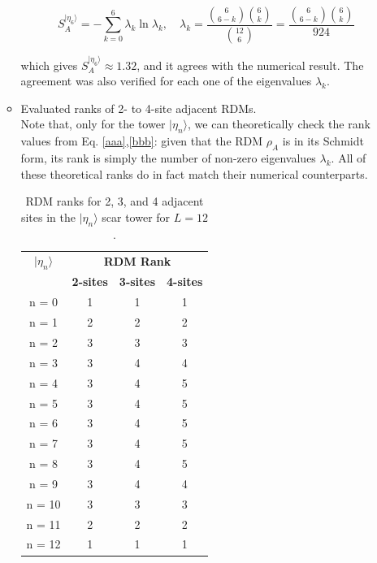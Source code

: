 \documentclass[11pt]{article}
\begin{document}
\begin{itemize}
\begin{itemize}
        \begin{equation}
        S^{|\eta_6\rangle }_A = - \sum_{k=0}^{6} \lambda_k \ln \lambda_k, \quad \lambda_k = \frac{\binom{6}{6-k}\binom{6}{k}}{\binom{12}{6}} =  \frac{\binom{6}{6-k}\binom{6}{k}}{924}
        \end{equation}
        
        which gives $S^{|\eta_6\rangle }_A \approx 1.32$, and it agrees with the numerical result. The agreement was also verified for each one of the eigenvalues $\lambda_k$.
         
        \item Evaluated ranks of 2- to 4-site adjacent RDMs.\\
        Note that, only for the tower $|\eta_n\rangle$, we can theoretically check the rank values from Eq. \eqref{aaa},\eqref{bbb}: given that the RDM $\rho_A$ is in its Schmidt form, its rank is simply the number of non-zero eigenvalues $\lambda_k$. All of these theoretical ranks do in fact match their numerical counterparts.\\
        
         \begin{table}[H]
	\centering
	\begin{tabular}{|c|ccc|}
	\hline
	\textbf{$|\eta_n\rangle$} & \multicolumn{3}{c|}{\textbf{RDM Rank}} \\
	\cline{2-4}
	& \textbf{2-sites} & \textbf{3-sites} & \textbf{4-sites}\\
	\hline
	 n = 0 & 1 & 1 & 1 \\
	 n = 1 & 2 & 2 & 2 \\
	 n = 2 & 3 & 3 & 3 \\
	 n = 3 & 3 & 4 & 4 \\
	 n = 4 & 3 & 4 & 5 \\  
	 n = 5 & 3 & 4 & 5 \\
	 n = 6 & 3 & 4 & 5 \\
	 n = 7 & 3 & 4 & 5 \\
	 n = 8 & 3 & 4 & 5 \\
	 n = 9 & 3 & 4 & 4 \\
	 n = 10 & 3 & 3 & 3 \\
	 n = 11 & 2 & 2 & 2 \\
	 n = 12 & 1 & 1 & 1 \\
	\hline
	\end{tabular}
	\caption{RDM ranks for 2, 3, and 4 adjacent sites in the $|\eta_n\rangle$ scar tower for $L=12$.}
	\label{tab:ranks21}
	\end{table}


\end{itemize}
\end{itemize}
\end{document}
